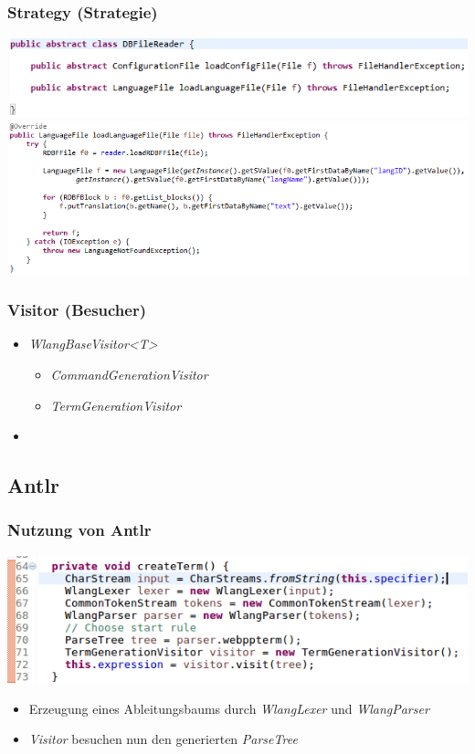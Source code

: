 \documentclass{beamer}
\begin{document}
\begin{frame}
\frametitle{Strategy (Strategie)}
\includegraphics[scale=0.5]{../document_data/loadLangFileAbstract.png}
\includegraphics[scale=0.5]{../document_data/loadLangFile.png}
\end{frame}

\begin{frame}
\frametitle{Visitor (Besucher)}
\begin{itemize}
\item \textit{WlangBaseVisitor<T>}
\begin{itemize}
\item \textit{CommandGenerationVisitor}
\item \textit{TermGenerationVisitor}
\end{itemize}
\item %
\end{itemize}
\end{frame}

\subsection{Antlr}
\begin{frame}
\frametitle{Nutzung von Antlr}
\includegraphics[scale=0.5]{../document_data/createTerm.png}
\begin{itemize}
\item Erzeugung eines Ableitungsbaums durch \textit{WlangLexer} und \textit{WlangParser}
\item \textit{Visitor} besuchen nun den generierten \textit{ParseTree}
\end{itemize}
\end{frame}
\end{document}
